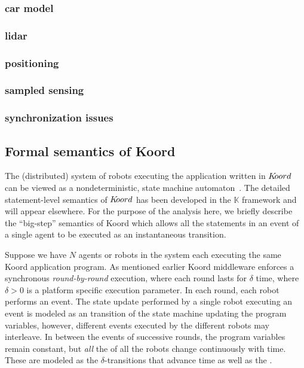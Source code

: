 \subsubsection{car model}
\subsubsection{lidar}
\subsubsection{positioning}
\subsubsection{sampled sensing}
\subsubsection{synchronization issues}

\subsection{Formal semantics of Koord}
\label{sec:semantics}

The (distributed) system of robots  executing the \dmap application written in $K\kern-2pt oord$ can be viewed as a nondeterministic, state machine automaton~\cite{TIOAmon, Mitra07PhD}. The detailed statement-level semantics of $K\kern-2pt oord$ has been developed in the $\mathbb{K}$ framework and will appear elsewhere. For the purpose of the analysis here, we briefly describe the ``big-step'' semantics of Koord which allows all the statements in an event of a single agent to be executed as an instantaneous transition. 

Suppose we have $N$ agents or robots in the system each executing the same Koord application program. As mentioned earlier Koord middleware enforces a synchronous  \emph{round-by-round} execution, where each round lasts for $\delta$ time, where $\delta >0$ is a platform specific execution parameter. 
%
In each round, each robot performs an  event.
The state update performed by a single robot executing an  event is modeled as an  transition of the state machine updating the program variables, however,  different events executed by the different robots may interleave. In between the events of successive rounds, the program variables remain constant, but {\em all\/} the  of all the robots  change continuously with time.  These are modeled as the $\delta$-transitions that advance time as well as the .

